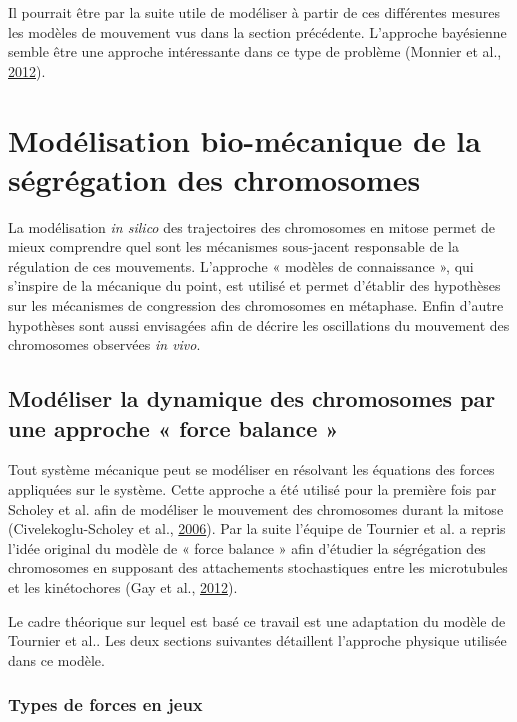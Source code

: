 \documentclass[12pt,a4paper,twoside,openright]{book}
\begin{document}
Il pourrait être par la suite utile de modéliser à partir de ces
différentes mesures les modèles de mouvement vus dans la section
précédente. L'approche bayésienne semble être une approche intéressante
dans ce type de problème (Monnier et al.,
\hyperref[ref-Monnier2012]{2012}).

\section{Modélisation bio-mécanique de la ségrégation des
chromosomes}\label{moduxe9lisation-bio-muxe9canique-de-la-suxe9gruxe9gation-des-chromosomes}

La modélisation \emph{in silico} des trajectoires des chromosomes en
mitose permet de mieux comprendre quel sont les mécanismes sous-jacent
responsable de la régulation de ces mouvements. L'approche « modèles de
connaissance », qui s'inspire de la mécanique du point, est utilisé et
permet d'établir des hypothèses sur les mécanismes de congression des
chromosomes en métaphase. Enfin d'autre hypothèses sont aussi envisagées
afin de décrire les oscillations du mouvement des chromosomes observées
\emph{in vivo}.

\subsection{Modéliser la dynamique des chromosomes par une approche «
force balance
»}\label{moduxe9liser-la-dynamique-des-chromosomes-par-une-approche-force-balance}

Tout système mécanique peut se modéliser en résolvant les équations des
forces appliquées sur le système. Cette approche a été utilisé pour la
première fois par Scholey et al. afin de modéliser le mouvement des
chromosomes durant la mitose (Civelekoglu-Scholey et al.,
\hyperref[ref-Civelekoglu-Scholey2006]{2006}). Par la suite l'équipe de
Tournier et al. a repris l'idée original du modèle de « force balance »
afin d'étudier la ségrégation des chromosomes en supposant des
attachements stochastiques entre les microtubules et les kinétochores
(Gay et al., \hyperref[ref-Gay2012a]{2012}).

Le cadre théorique sur lequel est basé ce travail est une adaptation du
modèle de Tournier et al.. Les deux sections suivantes détaillent
l'approche physique utilisée dans ce modèle.

\subsubsection{Types de forces en jeux}\label{types-de-forces-en-jeux}
\end{document}
